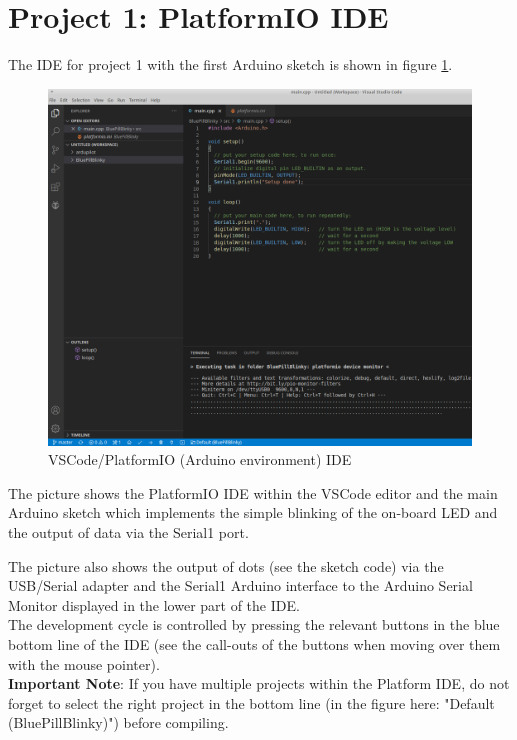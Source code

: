 \documentclass[11pt, oneside]{scrartcl}   	%
\begin{document}
\section{Project 1: PlatformIO IDE }
The IDE for project 1 with the first Arduino sketch is shown in figure \ref{fig:IDESetup}.
\begin{figure}[htbp]
	\centering
	\includegraphics[width=1.0\linewidth]{Figures/VSCode+PlatformIO+SerialMonitor+Blinky.png}
	\caption{VSCode/PlatformIO (Arduino environment) IDE}
	\label{fig:IDESetup}
\end{figure}
The picture shows the PlatformIO IDE within the VSCode editor and the main Arduino sketch which implements the simple blinking of the on-board LED and the output of data via the Serial1 port.

The picture also shows the output of dots (see the sketch code) via the USB/Serial adapter and the Serial1 Arduino interface
to the Arduino Serial Monitor displayed in the lower part of the IDE.\\

The development cycle is controlled by pressing the relevant buttons in the blue bottom line of the IDE (see the call-outs of the buttons when moving over them with the mouse pointer).\\

\textbf{Important Note}: If you have multiple projects within the Platform IDE, do not forget to select the right project in the bottom line (in the figure here:
"Default (BluePillBlinky)") before compiling.\\
\end{document}
